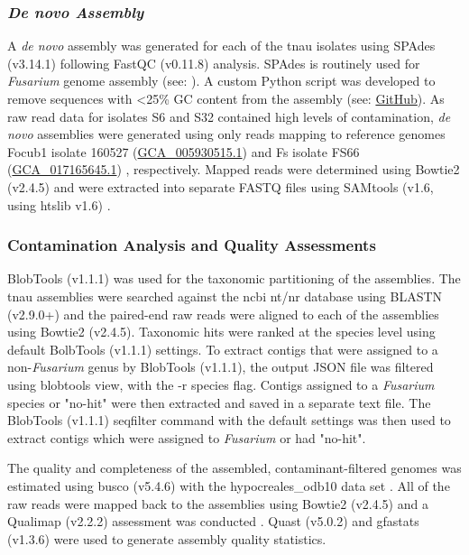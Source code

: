 \subsubsection{\textit{De novo Assembly}}
A \textit{de novo} assembly was generated for each of the \ac{tnau} isolates using SPAdes (v3.14.1) \parencite{Prjibelski2020} following FastQC (v0.11.8) analysis. SPAdes is routinely used for \textit{Fusarium} genome assembly
(see: \textcite{Armitage2018, Hudson2020, Tanaka2022}). A custom Python script was developed to remove sequences with <25\% GC content from the assembly (see: \href{https://github.com/JamiePike/NewTools-Project/blob/master/bin/gcTrimmer.py}{GitHub}). As raw read data for isolates S6 and S32 contained high levels of contamination, \textit{de novo} assemblies were generated using only reads mapping to reference genomes \ac{Focub1} isolate 160527 (\href{https://www.ncbi.nlm.nih.gov/datasets/genome/GCA_005930515.1/}{GCA\_005930515.1}) \parencite{Asai2019} and \ac{Fs} isolate FS66 (\href{https://www.ncbi.nlm.nih.gov/datasets/genome/GCA_017165645.1/}{GCA\_017165645.1}) \parencite{Cui2021}, respectively. Mapped reads were determined using Bowtie2 (v2.4.5) and were extracted into separate FASTQ files using SAMtools (v1.6, using htslib v1.6) \parencite{Danecek2021}. 

\subsubsection{Contamination Analysis and Quality Assessments}
BlobTools (v1.1.1) \parencite{Laetsch2017} was used for the taxonomic partitioning of the assemblies. The \ac{tnau} assemblies were searched against the \ac{ncbi} nt/nr database using BLASTN (v2.9.0+) and the paired-end raw reads were aligned to each of the assemblies using Bowtie2 (v2.4.5). Taxonomic hits were ranked at the species level using default BolbTools (v1.1.1) settings. To extract contigs that were assigned to a non-\textit{Fusarium} genus by BlobTools (v1.1.1), the output JSON file was filtered using blobtools view, with the -r species flag. Contigs assigned to a \textit{Fusarium} species or "no-hit" were then extracted and saved in a separate text file. The BlobTools (v1.1.1) seqfilter command with the default settings was then used to extract contigs which were assigned to \textit{Fusarium} or had "no-hit".

The quality and completeness of the assembled, contaminant-filtered genomes was estimated using \ac{busco} (v5.4.6) with the hypocreales\_odb10 data set \parencite{Manni2021}. All of the raw reads were mapped back to the assemblies using Bowtie2 (v2.4.5) and a Qualimap (v2.2.2) assessment was conducted \parencite{Garcia-Alcalde2012}. Quast (v5.0.2) \parencite{Gurevich2013}  and gfastats (v1.3.6) \parencite{Formenti2022} were used to generate assembly quality statistics. 

